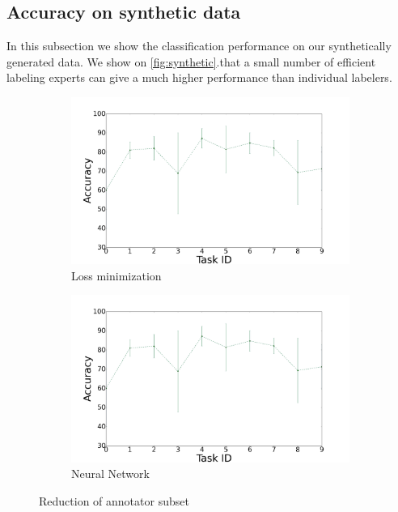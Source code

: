 \documentclass{llncs}
\begin{document}
\subsection{Accuracy on synthetic data}

In this subsection we show the classification performance on our synthetically generated data. We show on \autoref{fig:synthetic}.that a small number of efficient labeling experts can give a much higher performance than individual labelers. 

\begin{figure}[!htb]
    \centering
    \begin{subfigure}[b]{0.45\textwidth}
        \includegraphics[width=\textwidth]{figures/plot_mlp}
        \caption{Loss minimization}
    \end{subfigure}
    \begin{subfigure}[b]{0.45\textwidth}
        \includegraphics[width=\textwidth]{figures/plot_mlp}
        \caption{Neural Network}
    \end{subfigure}
  \caption{Reduction of annotator subset}
  \label{fig:synthetic}
\end{figure}
\end{document}
